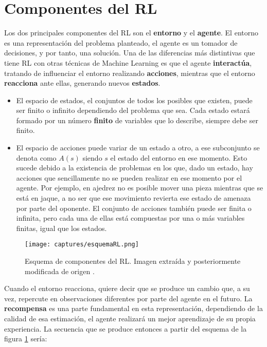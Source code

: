 \documentclass[11pt,fleqn]{book} %
\begin{document}
\section{Componentes del RL}\label{sec:componentesRL}

Los dos principales componentes del RL son el \textbf{entorno} y el \textbf{agente}. El entorno es una representación del problema planteado, el agente es un tomador de decisiones, y por tanto, una solución. Una de las diferencias más distintivas que tiene RL con otras técnicas de Machine Learning es que el agente \textbf{interactúa}, tratando de influenciar el entorno realizando \textbf{acciones}, mientras que el entorno \textbf{reacciona} ante ellas, generando nuevos \textbf{estados}. \\

\begin{itemize}
	\item El espacio de estados, el conjuntos de todos los posibles que existen, puede ser finito o infinito dependiendo del problema que sea. Cada estado estará formado por un número \textbf{finito} de variables que lo describe, siempre debe ser finito. \\
	
	\item El espacio de acciones puede variar de un estado a otro, a ese subconjunto se denota como $A(s)$ siendo $s$ el estado del entorno en ese momento. Esto sucede debido a la existencia de problemas en los que, dado un estado, hay acciones que sencillamente no se pueden realizar en ese momento por el agente. Por ejemplo, en ajedrez no es posible mover una pieza mientras que se está en jaque, a no ser que ese movimiento revierta ese estado de amenaza por parte del oponente. El conjunto de acciones también puede ser finita o infinita, pero cada una de ellas está compuestas por una o más variables finitas, igual que los estados.
\end{itemize}

\begin{figure}[H]
	\centering\texttt{[image: captures/esquemaRL.png]}
	\caption{Esquema de componentes del RL. Imagen extraída y posteriormente modificada de origen \cite{article:RLwikipedia}.}
	\label{fig:esquemaRL} %
\end{figure}

Cuando el entorno reacciona, quiere decir que se produce un cambio que, a su vez, repercute en observaciones diferentes por parte del agente en el futuro. La \textbf{recompensa} es una parte fundamental en esta representación, dependiendo de la calidad de esa estimación, el agente realizará un mejor aprendizaje de su propia experiencia. La secuencia que se produce entonces a partir del esquema de la figura \ref{fig:esquemaRL} sería:
\end{document}
